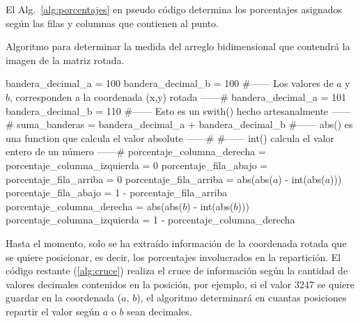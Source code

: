 El Alg.~\ref{alg:porcentajes} en pseudo código determina los
porcentajes asignados según las filas y columnas que contienen al
punto.

\begin{algorithm}
\caption{Algoritmo para determinar la medida del arreglo bidimensional
que contendrá la imagen de la matriz rotada.}\label{alg:porcentajes}
\label{alg:porcentajes}
\begin{algorithmic}[1]
\STATE bandera\_decimal\_a = 100
\STATE bandera\_decimal\_b = 100
\STATE \#------ Los valores de $a$ y $b$, corresponden a la coordenada (x,y) rotada ------\#
\STATE bandera\_decimal\_a = 101
\ENDIF
{}
\STATE bandera\_decimal\_b = 110
\ENDIF
\STATE \#------ Esto es un swith() hecho artesanalmente ------\#
\STATE suma\_banderas = bandera\_decimal\_a + bandera\_decimal\_b
\STATE \#------ abs() es una function que calcula el valor absolute ------\#
\STATE \#------ int() calcula el valor entero de un número ------\#
\STATE porcentaje\_columna\_derecha = porcentaje\_columna\_izquierda = 0
\STATE porcentaje\_fila\_abajo = porcentaje\_fila\_arriba = 0
\STATE porcentaje\_fila\_arriba = abs(abs($a$) - int(abs($a$)))
\STATE porcentaje\_fila\_abajo  = 1 - porcentaje\_fila\_arriba
\STATE porcentaje\_columna\_derecha = abs(abs($b$) - int(abs($b$)))
\STATE porcentaje\_columna\_izquierda = 1 - porcentaje\_columna\_derecha
\ENDWHILE
\ENDFOR
\ENDFOR
\end{algorithmic}
\end{algorithm}

Hasta el momento, solo se ha extraído información de la coordenada
rotada que se quiere posicionar, es decir, los porcentajes
involucrados en la repartición. El código restante (\ref{alg:cruce})
realiza el cruce de información según la cantidad de valores decimales
contenidos en la posición, por ejemplo, si el valor 3247 se quiere
guardar en la coordenada ($a$, $b$), el algoritmo determinará en
cuantas posiciones repartir el valor según $a$ o $b$ sean decimales.

